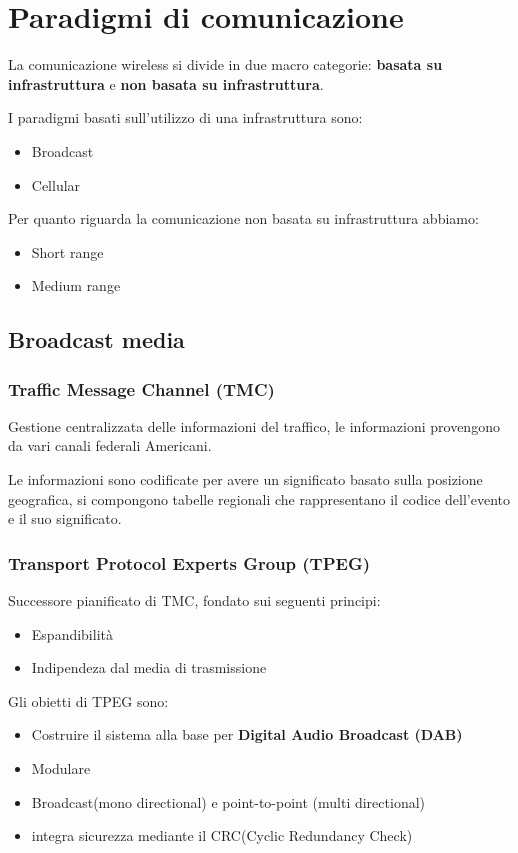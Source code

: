 \section{Paradigmi di comunicazione}
La comunicazione wireless si divide in due macro categorie: \textbf{basata su infrastruttura} e
\textbf{non basata su infrastruttura}.

I paradigmi basati sull'utilizzo di una infrastruttura sono:
\begin{itemize}
	\item Broadcast
	\item Cellular
\end{itemize}

Per quanto riguarda la comunicazione non basata su infrastruttura abbiamo:
\begin{itemize}
	\item Short range
	\item Medium range
\end{itemize}


\subsection{Broadcast media}
\subsubsection{Traffic Message Channel (TMC)}

Gestione centralizzata delle informazioni del traffico, le informazioni provengono da vari canali
federali Americani.

Le informazioni sono codificate per avere un significato basato sulla posizione geografica, si
compongono tabelle regionali che rappresentano il codice dell'evento e il suo significato.


\subsubsection{Transport Protocol Experts Group (TPEG)}

Successore pianificato di TMC, fondato sui seguenti principi:
\begin{itemize}
	\item Espandibilità
	\item Indipendeza dal media di trasmissione
\end{itemize}


Gli obietti di TPEG sono:
\begin{itemize}
	\item Costruire il sistema alla base per \textbf{Digital Audio Broadcast (DAB)}
	\item Modulare
	\item Broadcast(mono directional) e point-to-point (multi directional)
	\item integra sicurezza mediante il CRC(Cyclic Redundancy Check)
\end{itemize}


